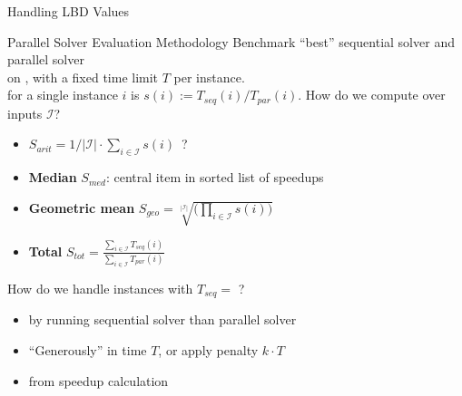 \documentclass[t,english]{sdqbeamer}
\begin{document}
\begin{frame}{Handling LBD Values}
\begin{minipage}{0.4\textwidth}
		\vspace*{0.2cm}
	\end{minipage}%
\end{frame}

\begin{frame}{Parallel Solver Evaluation Methodology}
	Benchmark ``best'' sequential solver  and parallel solver\\
	on , with a fixed time limit $T$ per instance.
	\\
	\vspace*{6mm}
	 for a single instance $i$ is $s(i) := {T_{\textit{seq}}(i)} / {T_{\textit{par}}(i)}$.
	How do we compute  over inputs $\mathcal{I}$?
	\pause
	\vspace*{2mm}
	\begin{itemize}
		\item {} $S_{\textit{arit}} = 1/|\mathcal{I}| \cdot \sum_{i \in \mathcal{I}} s(i)$~?\pause\quad\quad{}
		\pause
		\item \textbf{Median} $S_{\textit{med}}$: central item in sorted list of speedups
		\quad\quad{}
		\pause
		\item \textbf{Geometric mean} $S_{\textit{geo}} = \sqrt[|\mathcal{I}|]{\big(\prod_{i \in \mathcal{I}} s(i)\big)}$
		\quad\quad{}
		\pause
		\item \textbf{Total} $S_{\textit{tot}} = \frac{\sum_{i \in \mathcal{I}} T_{\textit{seq}}(i)}{\sum_{i \in \mathcal{I}} T_{\textit{par}}(i)}$
		\quad\quad{}
	\end{itemize}
	\vspace*{6mm}
	\pause
	How do we handle instances with $T_{\textit{seq}} =$ ?
	\pause
	\vspace*{2mm}
	\begin{itemize}
		\item {} by running sequential solver  than parallel solver
		\pause
		\item ``Generously''  in time $T$, or apply penalty $k \cdot T$
		\quad\quad{}
		\pause
		\item {} from speedup calculation
		\quad\quad{}
	\end{itemize}
\end{frame}
\end{document}
